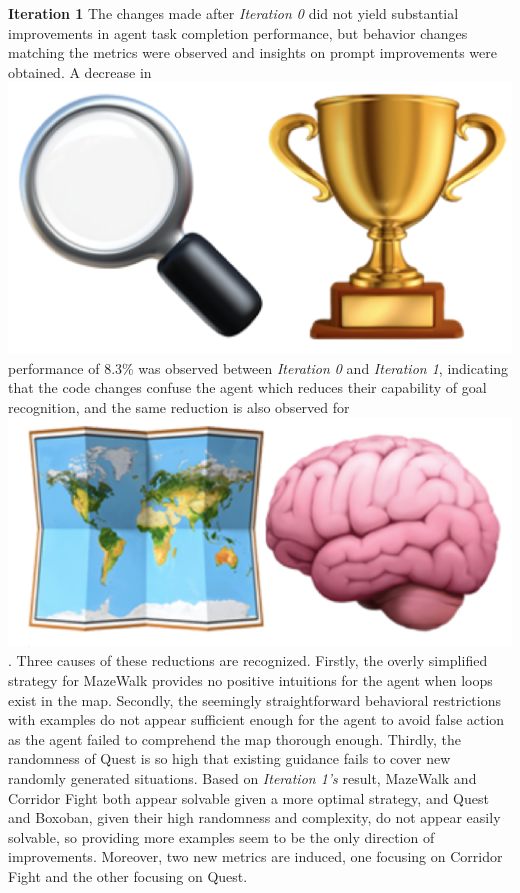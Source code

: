\begin{flushleft}
\textbf{Iteration 1}
The changes made after \emph{Iteration 0} did not yield substantial improvements in agent task completion performance, but behavior changes matching the metrics were observed and insights on prompt improvements were obtained. A decrease in \includegraphics[scale=0.07]{figs/emojis/mini_1.png} performance of 8.3\% was observed between \emph{Iteration 0} and \emph{Iteration 1}, indicating that the code changes confuse the agent which reduces their capability of goal recognition, and the same reduction is also observed for \includegraphics[scale=0.07]{figs/emojis/mini_2.png}. Three causes of these reductions are recognized. Firstly, the overly simplified strategy for MazeWalk provides no positive intuitions for the agent when loops exist in the map. Secondly, the seemingly straightforward behavioral restrictions with examples do not appear sufficient enough for the agent to avoid false action as the agent failed to comprehend the map thorough enough. Thirdly, the randomness of Quest is so high that existing guidance fails to cover new randomly generated situations. Based on \emph{Iteration 1's} result, MazeWalk and Corridor Fight both appear solvable given a more optimal strategy, and Quest and Boxoban, given their high randomness and complexity, do not appear easily solvable, so providing more examples seem to be the only direction of improvements. Moreover, two new metrics are induced, one focusing on Corridor Fight and the other focusing on Quest. 


\end{flushleft}
